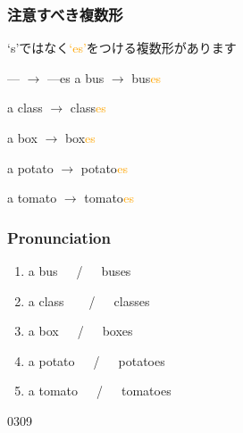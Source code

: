 \documentclass[aspectratio=169,xcolor={dvipsnames,table}]{beamer}
\newcommand{\myaudio}[1]{\href{#1}{\faVolumeUp}}
\begin{document}
\begin{frame}[plain]\frametitle{注意すべき複数形}

{\Large `s'ではなく\textcolor{orange}{`es'}をつける複数形があります}
\pause

\bigskip

\begin{block}{--- $\rightarrow$ ---es}
a bus \pause$\longrightarrow$ bus\textcolor{orange}{es}\pause%
\hfill{}\hspace*{250pt}\pause

a class \pause$\longrightarrow$ class\textcolor{orange}{es}\pause
\hfill{}\hspace*{250pt}\pause

a box \pause $\longrightarrow$ box\textcolor{orange}{es}\pause
\hfill{}\hspace*{250pt}\pause

a potato \pause$\longrightarrow$ potato\textcolor{orange}{es}\pause
\hfill{}\hspace*{250pt}\pause

a tomato \pause$\longrightarrow$ tomato\textcolor{orange}{es}\pause
\hfill{}\hspace*{250pt}
\end{block}
\end{frame}
\begin{frame}[plain]\frametitle{Pronunciation}

\begin{enumerate}
 \item a bus~~~\pause{}/~~~buses\pause%
\hfill{}\hspace{180pt}\mbox{} \item a class~~~~\pause{}/~~~classes\pause%
\hfill{}\hspace{180pt}\mbox{}
 \item a box~~~\pause{}/~~~boxes\pause%
\hfill{}\hspace{180pt}\mbox{}
 \item a potato~~~\pause{}/~~~potatoes\pause%
\hfill{}\hspace{180pt}\mbox{} \item a tomato~~~\pause{}/~~~tomatoes%
\hfill{}\hspace{180pt}\mbox{}
 \end{enumerate}

\bigskip

\bigskip

\mbox{}\hfill{\tiny 0309}\,{\scriptsize \myaudio{./audio/005_singular_plural_07.mp3}}
\end{frame}
\end{document}
